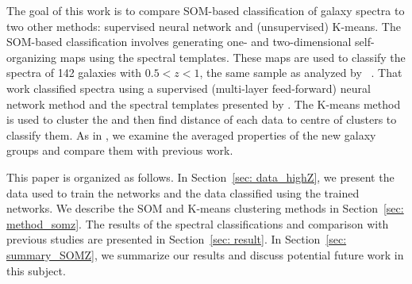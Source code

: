 The goal of this work is to compare SOM-based classification of galaxy spectra to two other methods: supervised neural network and (unsupervised) K-means. 
The SOM-based classification involves generating one- and two-dimensional self-organizing maps using the  spectral templates. 
These maps are used to classify the spectra of 142 galaxies with $0.5 < z < 1$, the same
sample as analyzed by ~\citet[][hereafter ]{Hossein12}.
That work classified spectra using a supervised (multi-layer feed-forward) neural network method and the spectral templates presented by .
The K-means method is used to cluster the  and then find distance of each  data to centre of clusters to classify them.
 As in , we examine the averaged properties of the new galaxy groups and compare them with previous work.




This paper is organized as follows.
In Section~\ref{sec: data_highZ}, we present the data used to train the networks and the data classified using the trained networks. 
We describe the SOM and K-means clustering methods in Section~\ref{sec: method_somz}. 
The results of the spectral classifications and comparison with previous studies are presented in Section~\ref{sec: result}. 
In Section~\ref{sec: summary_SOMZ}, we summarize our results and discuss potential future work in this subject.